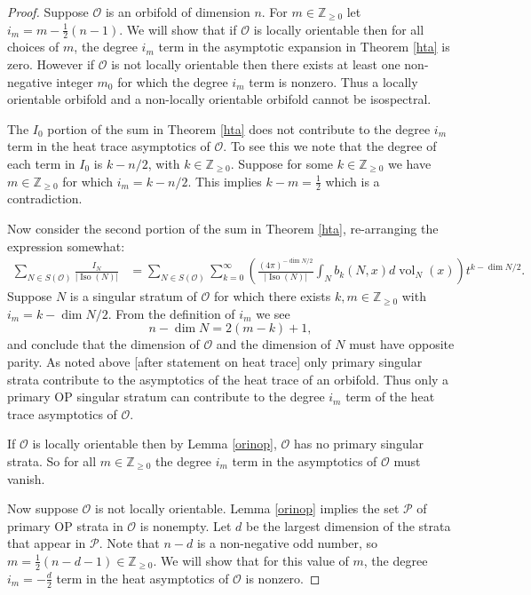 \documentclass{amsart}
\theoremstyle{plain}
\theoremstyle{definition}
\theoremstyle{remark}
\newcommand{\myabs}[1]{\vert#1\vert}
\newcommand{\cp}{\mathcal{P}}
\newcommand{\orb}{\mathcal O}
\DeclareMathOperator{\iso}{Iso}
\DeclareMathOperator{\vol}{vol}
\begin{document}
\begin{proof} Suppose $\orb$ is an orbifold of dimension $n$.  For $m \in \mathbb{Z}_{\ge 0}$ let $i_m=m-\tfrac{1}{2}(n-1)$.  We will show that if $\orb$ is locally orientable then for all choices of $m$, the degree $i_m$ term in the asymptotic expansion in Theorem \ref{hta} is zero.  However if $\orb$ is not locally orientable then there exists at least one non-negative integer $m_0$ for which the degree $i_m$ term is nonzero.  Thus a locally orientable orbifold and a non-locally orientable orbifold cannot be isospectral.

The $I_0$ portion of the sum in Theorem \ref{hta} does not contribute to the degree $i_m$ term in the heat trace asymptotics of $\orb$.  To see this we note that the degree of each term in $I_0$ is $k-n/2$, with $k\in \mathbb{Z}_{\ge 0}$.  Suppose for some $k \in \mathbb{Z}_{\ge 0}$ we have $m \in \mathbb{Z}_{\ge 0}$ for which $i_m=k-n/2$.  This implies $k-m = \tfrac{1}{2}$ which is a contradiction.

Now consider the second portion of the sum in Theorem \ref{hta}, re-arranging the expression somewhat:
\begin{align}\label{stratumpart}
\sum_{N \in S(\mathcal{O})}\frac{I_N}{\myabs{\iso(N)}} &= \sum_{N \in S(\mathcal{O})} \sum_{k=0}^\infty \left( \frac{(4\pi)^{-\dim{N}/2}}{\myabs{\iso(N)}} \int_N b_k(N,x) d\vol_N(x) \right) t^{k-\dim{N}/2}.
\end{align}
Suppose $N$ is a singular stratum of $\orb$ for which there exists $k,m \in \mathbb{Z}_{\ge 0}$ with $i_m=k-\dim{N}/2$.  From the definition of $i_m$ we see $$n-\dim{N} = 2(m-k)+1,$$ and conclude that the dimension of $\orb$ and the dimension of $N$ must have opposite parity.  As noted above [after statement on heat trace] only primary singular strata contribute to the asymptotics of the heat trace of an orbifold.  Thus only a primary OP singular stratum can contribute to the degree $i_m$ term of the heat trace asymptotics of $\orb$.

If $\orb$ is locally orientable then by Lemma \ref{orinop}, $\orb$ has no primary singular strata.  So for all $m \in \mathbb{Z}_{\ge 0}$ the degree $i_m$ term in the asymptotics of $\orb$ must vanish.  

Now suppose $\orb$ is not locally orientable.  Lemma \ref{orinop} implies the set $\cp$ of primary OP strata in $\orb$ is nonempty.  Let $d$ be the largest dimension of the strata that appear in $\cp$.  Note that $n-d$ is a non-negative odd number, so $m=\tfrac{1}{2}(n-d-1) \in \mathbb{Z}_{\ge 0}$.  We will show that for this value of $m$, the degree $i_m=-\tfrac{d}{2}$ term in the heat asymptotics of $\orb$ is nonzero.




\end{proof}
\end{document}
